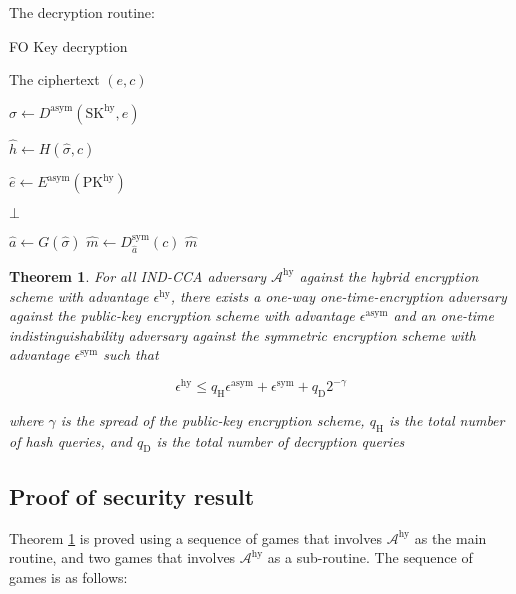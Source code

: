 \documentclass{article}
\newtheorem{theorem}{Theorem}[section]
\begin{document}
\pagebreak

The decryption routine:

\begin{algorithm}
\caption{FO Key decryption}\label{fo-key-dec}
\begin{algorithmic}[1]  %
    \Require The ciphertext $(e, c)$

    \State $
        \hat{\sigma} \leftarrow D^\text{asym}(\text{SK}^\text{hy}, e)
    $

    \State $
        \hat{h} \leftarrow H(\hat{\sigma}, c)
    $

    \State $
        \hat{e} \leftarrow E^\text{asym}(\text{PK}^\text{hy})
    $

        \State \Return $\bot$
    \EndIf

    \State $\hat{a} \leftarrow G(\hat{\sigma})$
    \State $\hat{m} \leftarrow D^\text{sym}_{\hat{a}}(c)$
    \State \Return $\hat{m}$
\end{algorithmic}
\end{algorithm}

\begin{theorem}\label{fo-security-theorem}
    For all IND-CCA adversary $\mathcal{A}^\text{hy}$ against the hybrid encryption scheme with advantage $\epsilon^\text{hy}$, there exists a one-way one-time-encryption adversary against the public-key encryption scheme with advantage $\epsilon^\text{asym}$ and an one-time indistinguishability adversary against the symmetric encryption scheme with advantage $\epsilon^\text{sym}$ such that

    \begin{equation*}
        \epsilon^\text{hy} \leq q_\text{H}\epsilon^\text{asym} + \epsilon^\text{sym} + q_\text{D}2^{-\gamma}
    \end{equation*}

    where $\gamma$ is the spread of the public-key encryption scheme, $q_\text{H}$ is the total number of hash queries, and $q_\text{D}$ is the total number of decryption queries
\end{theorem}

\subsection{Proof of security result}
Theorem \ref{fo-security-theorem} is proved using a sequence of games that involves $\mathcal{A}^\text{hy}$ as the main routine, and two games that involves $\mathcal{A}^\text{hy}$ as a sub-routine. The sequence of games is as follows:
\end{document}
